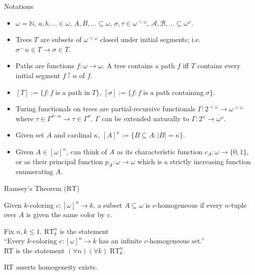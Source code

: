 \begin{frame}{Notations}
  \begin{itemize}
    \item $\omega=\mathbb{N}$, $a,b,\ldots\in\omega$,
      $A,B,\ldots\subseteq\omega$, $\sigma,\tau\in\omega^{<\omega}$,
      $\mathcal{A},\mathcal{B},\ldots\subseteq\omega^\omega$.
    \item Trees $T$ are subsets of $\omega^{<\omega}$ closed under initial
      segments; i.e. $\sigma^{\frown}n\in T \rightarrow \sigma\in T$.
    \item Paths are functions $f:\omega\rightarrow\omega$. A tree contains
      a path $f$ iff $T$ contains every initial segment $f\restriction n$
      of $f$.
    \item $[T] :=\{f:f\; \text{is a path in}\; T\}$, $[\sigma]:=\{f:f\;
      \text{is a path containing}\; \sigma\}$.
    \item Turing functionals on trees are partial-recursive functionals
      $\Gamma:2^{<\omega}\rightarrow\omega^{<\omega}$ where
      $\tau\in\Gamma^{\sigma^\frown n} \rightarrow
      \tau\in\Gamma^{\sigma}$. $\Gamma$ can be extended naturally to
      $\Gamma:2^\omega\rightarrow\omega^{\omega}$.
    \item Given set $A$ and cardinal $\kappa$, $[A]^\kappa
      :=\{B\subseteq A: |B|=\kappa\}$.
    \item Given $A\in[\omega]^\omega$, can think of $A$ as its characteristic
      function $c_A:\omega\rightarrow\{0,1\}$, or as their principal
      function $p_A:\omega\rightarrow\omega$ which is a strictly increasing
      function enumerating $A$.
  \end{itemize}
\end{frame}

\begin{frame}{Ramsey's Theorem ($\text{RT}$)}
  \begin{define*}[$c$-homogeneous]
    Given $k$-coloring $c:[\omega]^n\rightarrow k$, a subset
    $A\subseteq\omega$ is $c$-homogeneous if every $n$-tuple over $A$ is
    given the same color by $c$.
  \end{define*}

  \vspace{1em}
  \begin{thm*}
    Fix $n,k\leq1$. $\text{RT}_k^n$ is the statement\\
    ``Every $k$-coloring $c:[\omega]^n\rightarrow k$ has an infinite
    $c$-homogeneous set.''\\
    RT is the statement $(\forall n)(\forall k)\; \text{RT}_k^n$.
  \end{thm*}

  \vspace{1em}
  RT asserts homogeneity exists.
\end{frame}


